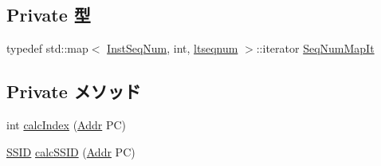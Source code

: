 \subsection*{Private 型}
\begin{DoxyCompactItemize}
\item 
typedef std::map$<$ \hyperlink{inst__seq_8hh_a258d93d98edaedee089435c19ea2ea2e}{InstSeqNum}, int, \hyperlink{structltseqnum}{ltseqnum} $>$::iterator \hyperlink{classStoreSet_afaca5122d48a680d2adb3b6f841528eb}{SeqNumMapIt}
\end{DoxyCompactItemize}
\subsection*{Private メソッド}
\begin{DoxyCompactItemize}
\item 
int \hyperlink{classStoreSet_aeabab6ef1f2a8e942739203158d70041}{calcIndex} (\hyperlink{base_2types_8hh_af1bb03d6a4ee096394a6749f0a169232}{Addr} PC)
\item 
\hyperlink{classStoreSet_a3cffbd955ca25d7d74d98168c6ea2404}{SSID} \hyperlink{classStoreSet_a6b9767a09067554b634a93c4454fa136}{calcSSID} (\hyperlink{base_2types_8hh_af1bb03d6a4ee096394a6749f0a169232}{Addr} PC)
\end{DoxyCompactItemize}
